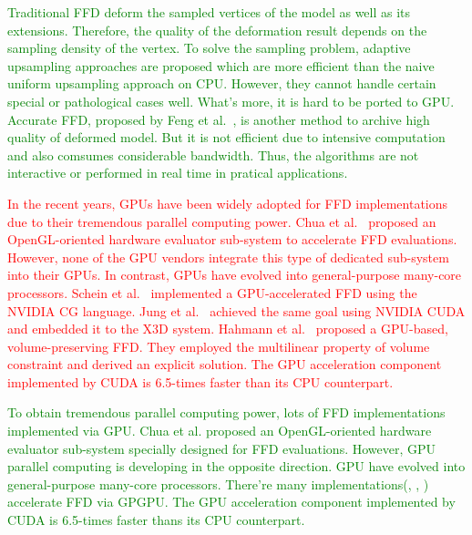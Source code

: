 \documentclass[3p]{elsarticle}
\begin{document}
\textcolor{green}{
    Traditional FFD deform the sampled vertices of the model as well as its extensions. Therefore, the quality of the deformation result depends on the sampling density of the vertex. To solve the sampling problem, adaptive upsampling approaches \cite{Gain99, Griessmair89, Parry86} are proposed which are more efficient than the naive uniform upsampling approach on CPU. However, they cannot handle certain special or pathological cases well. What's more, it is hard to be ported to GPU. Accurate FFD, proposed by Feng et al.~\cite{Feng98, Feng02, Feng00}, is another method to archive high quality of deformed model. But it is not efficient due to intensive computation and also comsumes considerable bandwidth. Thus, the algorithms are not interactive or performed in real time in pratical applications.
}

\textcolor{red}{In the recent years, GPUs have been widely adopted for FFD implementations due to their tremendous parallel computing
power. Chua et al.~\cite{Chua00} proposed an OpenGL-oriented hardware evaluator sub-system to accelerate FFD
evaluations. However, none of the GPU vendors integrate this type of dedicated sub-system into their GPUs. In contrast,
GPUs have evolved into general-purpose many-core processors. Schein et al.~\cite{Schein06} implemented a GPU-accelerated
FFD using the NVIDIA CG language. Jung et al.~\cite{Jung11} achieved the same goal using NVIDIA CUDA and embedded it to
the X3D system. Hahmann et al.~\cite{Hahmann12} proposed a GPU-based, volume-preserving FFD. They employed the
multilinear property of volume constraint and derived an explicit solution. The GPU acceleration component implemented
by CUDA is 6.5-times faster than its CPU counterpart.}

\textcolor{green} {
    To obtain tremendous parallel computing power, lots of FFD implementations implemented via GPU. Chua et al. \cite{Chua00} proposed an OpenGL-oriented hardware evaluator sub-system specially designed for FFD evaluations. However, GPU parallel computing is developing in the opposite direction. GPU have evolved into general-purpose many-core processors. There're many implementations(\cite{Schein06}, \cite{Jung11}, \cite{Hahmann12}) accelerate FFD via GPGPU. The GPU acceleration component implemented by CUDA is 6.5-times faster thans its CPU counterpart.
}
\end{document}
